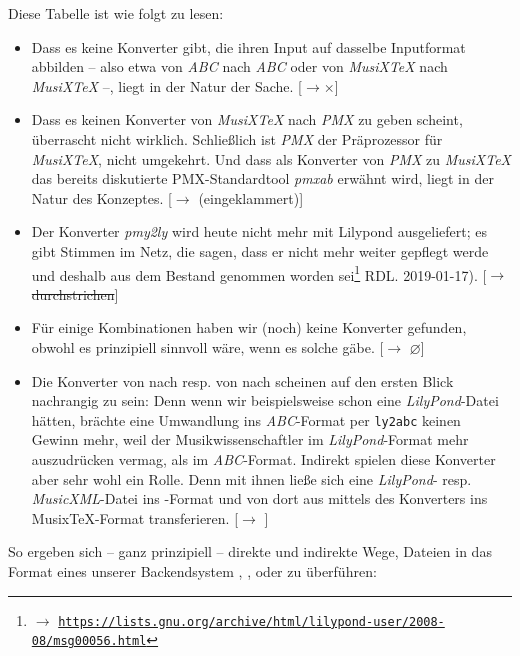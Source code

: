 Diese Tabelle ist wie folgt zu lesen:

\begin{itemize}
  \item Dass es keine Konverter gibt, die ihren Input auf dasselbe Inputformat
  abbilden -- also etwa von \textit{ABC} nach \textit{ABC} oder von
  \textit{MusiX\TeX} nach \textit{MusiX\-\TeX} --, liegt in der Natur der Sache.
  [$\rightarrow \times$]
  \item Dass es keinen Konverter von \textit{MusiX\TeX} nach \textit{PMX} zu
  geben scheint, überrascht nicht wirklich. Schließlich ist \textit{PMX} der
  Präprozessor für \textit{MusiX\TeX}, nicht umgekehrt. Und dass als Konverter
  von \textit{PMX} zu \textit{MusiX\TeX} das bereits diskutierte
  PMX-Standardtool \textit{pmxab} erwähnt wird, liegt in der Natur des
  Konzeptes. [$\rightarrow$ (eingeklammert)]
  \item Der Konverter \textit{pmy2ly} wird heute nicht mehr mit Lilypond
  ausgeliefert; es gibt Stimmen im Netz, die sagen, dass er nicht mehr weiter
  gepflegt werde und deshalb aus dem Bestand genommen worden sei\footnote{$\rightarrow$
  \href{https://lists.gnu.org/archive/html/lilypond-user/2008-08/msg00056.html}{
  \texttt{https://lists.gnu.org/archive/html/lilypond-user/2008-08/msg00056.html}}}
  RDL. 2019-01-17). [$\rightarrow$ \sout{durchstrichen}]
  \item Für einige Kombinationen haben wir (noch) keine Konverter gefunden,
  obwohl es prinzipiell sinnvoll wäre, wenn es solche gäbe. [$\rightarrow$
  $\varnothing$] 
  \item Die Konverter von  nach  resp. von 
  nach  scheinen auf den ersten Blick nachrangig zu sein: Denn wenn wir
  beispielsweise schon eine \textit{LilyPond}-Datei hätten, brächte eine
  Umwandlung ins \textit{ABC}-Format per \texttt{ly2abc} keinen Gewinn mehr,
  weil der Musikwissenschaftler im \textit{LilyPond}-Format mehr auszudrücken
  vermag, als im \textit{ABC}-Format. Indirekt spielen diese Konverter aber sehr
  wohl ein Rolle. Denn mit ihnen ließe sich eine \textit{LilyPond}- resp.
  \textit{MusicXML}-Datei ins -Format und von dort aus mittels des
  Konverters  ins Musix\TeX-Format transferieren.
  [$\rightarrow$ ]
\end{itemize}

So ergeben sich -- ganz prinzipiell -- direkte und indirekte Wege,
Dateien in das Format eines unserer Backendsystem , , 
 oder  zu überführen:

